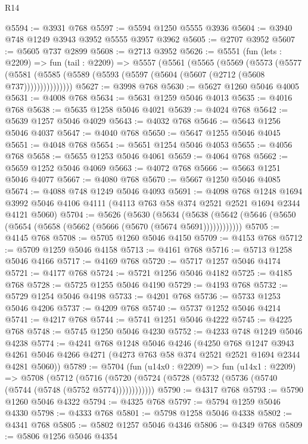 \begin{lexlean}{R14}
\begin{coremodule}
@5594 := @3931 @768
@5597 := @5594 @1250 @5555 @3936
@5604 := @3940 @748 @1249 @3943 @3952 @5555 @3957 @3962
@5605 := @2707 @3952
@5607 := @5605 @737 @2899
@5608 := @2713 @3952
@5626 := @5551
    (fun (lets : @2209) =>
    fun (tail : @2209) =>
    @5557
      (@5561
        (@5565
          (@5569
            (@5573
              (@5577
                (@5581 (@5585 (@5589 (@5593 (@5597 (@5604 (@5607 (@2712 (@5608 @737)))))))))))))))
@5627 := @3998 @768
@5630 := @5627 @1260 @5046 @4005
@5631 := @4008 @768
@5634 := @5631 @1259 @5046 @4013
@5635 := @4016 @768
@5638 := @5635 @1258 @5046 @4021
@5639 := @4024 @768
@5642 := @5639 @1257 @5046 @4029
@5643 := @4032 @768
@5646 := @5643 @1256 @5046 @4037
@5647 := @4040 @768
@5650 := @5647 @1255 @5046 @4045
@5651 := @4048 @768
@5654 := @5651 @1254 @5046 @4053
@5655 := @4056 @768
@5658 := @5655 @1253 @5046 @4061
@5659 := @4064 @768
@5662 := @5659 @1252 @5046 @4069
@5663 := @4072 @768
@5666 := @5663 @1251 @5046 @4077
@5667 := @4080 @768
@5670 := @5667 @1250 @5046 @4085
@5674 := @4088 @748 @1249 @5046 @4093
@5691 := @4098
    @768
    @1248
    @1694
    @3992
    @5046
    @4106
    @4111
    (@4113 @763 @58 @374 @2521 @2521 @1694 @2344 @4121 @5060)
@5704 := @5626
    (@5630
      (@5634 (@5638 (@5642 (@5646 (@5650 (@5654 (@5658 (@5662 (@5666 (@5670 (@5674 @5691))))))))))))
@5705 := @4145 @768
@5708 := @5705 @1260 @5046 @4150
@5709 := @4153 @768
@5712 := @5709 @1259 @5046 @4158
@5713 := @4161 @768
@5716 := @5713 @1258 @5046 @4166
@5717 := @4169 @768
@5720 := @5717 @1257 @5046 @4174
@5721 := @4177 @768
@5724 := @5721 @1256 @5046 @4182
@5725 := @4185 @768
@5728 := @5725 @1255 @5046 @4190
@5729 := @4193 @768
@5732 := @5729 @1254 @5046 @4198
@5733 := @4201 @768
@5736 := @5733 @1253 @5046 @4206
@5737 := @4209 @768
@5740 := @5737 @1252 @5046 @4214
@5741 := @4217 @768
@5744 := @5741 @1251 @5046 @4222
@5745 := @4225 @768
@5748 := @5745 @1250 @5046 @4230
@5752 := @4233 @748 @1249 @5046 @4238
@5774 := @4241
    @768
    @1248
    @5046
    @4246
    (@4250
      @768
      @1247
      @3943
      @4261
      @5046
      @4266
      @4271
      (@4273 @763 @58 @374 @2521 @2521 @1694 @2344 @4281 @5060))
@5789 := @5704
    (fun (u14x0 : @2209) =>
    fun (u14x1 : @2209) =>
    @5708
      (@5712 (@5716 (@5720 (@5724 (@5728 (@5732 (@5736 (@5740 (@5744 (@5748 (@5752 @5774))))))))))))
@5790 := @4317 @768
@5793 := @5790 @1260 @5046 @4322
@5794 := @4325 @768
@5797 := @5794 @1259 @5046 @4330
@5798 := @4333 @768
@5801 := @5798 @1258 @5046 @4338
@5802 := @4341 @768
@5805 := @5802 @1257 @5046 @4346
@5806 := @4349 @768
@5809 := @5806 @1256 @5046 @4354

\end{coremodule}
\end{lexlean}
